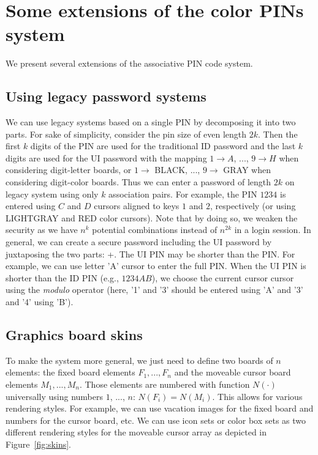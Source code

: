 \documentclass[12pt,onecolumn]{article}
\begin{document}
    
\section{Some extensions of the color PINs system\label{sec:ext}}


We present several extensions of the associative PIN code system.

\subsection{Using legacy password systems}

We can use legacy systems based on a single PIN by decomposing it into two parts.
For sake of simplicity, consider the pin size of even length $2k$.
Then the first $k$ digits of the PIN are used for the traditional ID password and the last $k$ digits are used for the UI password with the mapping $1\rightarrow A$, ..., $9\rightarrow H$ when considering digit-letter boards, or $1\rightarrow$ BLACK, ..., $9\rightarrow$ GRAY when considering digit-color boards.
Thus we can enter a password of length $2k$ on legacy system using only $k$ association pairs.
For example, the PIN $1234$ is entered using $C$ and $D$ cursors aligned to keys $1$ and $2$, respectively (or using LIGHTGRAY and RED color cursors).
Note that by doing so, we weaken the security as we have $n^{k}$ potential combinations instead of $n^{2k}$ in a login session.
In general, we can create a secure password including the UI password by juxtaposing the two parts: +.
The UI PIN may be shorter than the PIN. For example, we can use letter 'A' cursor to enter the full PIN. 
When the UI PIN is shorter than the ID PIN (e.g., $1234AB$), we choose the current cursor cursor using the {\em modulo} operator (here, '1' and '3' should be entered using 'A' and '3' and '4' using 'B').


\subsection{Graphics board skins\label{sec:skin}}

To make the system more general, we just need to define two boards of $n$ elements: the fixed board elements $F_1, ..., F_n$ and the moveable cursor board elements $M_1, ..., M_n$.
Those elements are numbered with function $N(\cdot)$ universally using numbers $1$, ..., $n$: $N(F_i) = N(M_i)$.
This allows for various rendering styles.
For example, we can use vacation images\cite{PassImage-2012} for the fixed board and numbers for the cursor board, etc.
We can use icon sets or color box sets as two different rendering styles for the moveable cursor array as depicted in Figure~\ref{fig:skins}.
\end{document}
